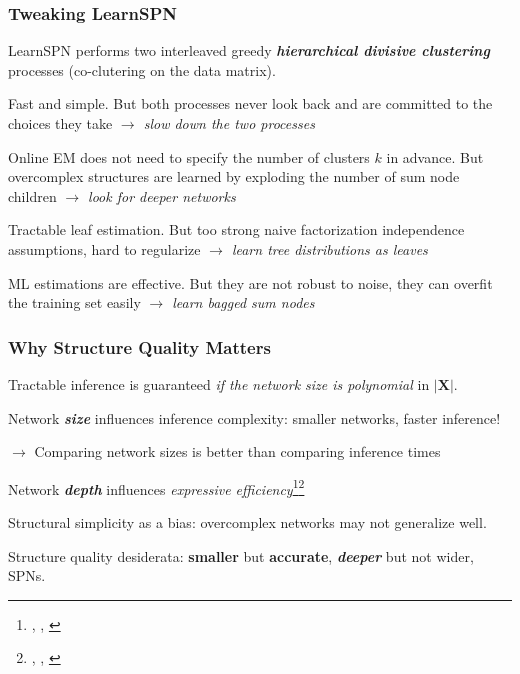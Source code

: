 \documentclass[10pt, t, xcolor={usenames,dvipsnames,svgnames}, compress]{beamer}
\newcommand{\customcite}[1]{\footnote{\scriptsize \citeauthor{#1}, \citetitle{#1}, \citeyear{#1}}}
\begin{document}
\begin{frame}
  \frametitle{Tweaking LearnSPN}
  
  \textsf{LearnSPN} performs two interleaved greedy
  \textbf{\emph{hierarchical divisive clustering}}
  processes (co-clutering on the data matrix).\par\bigskip

  Fast and simple. But both processes never look back and are
  committed to the choices they take \emph{$\rightarrow$ slow down the two
  processes}\par\bigskip

  Online EM does not need to specify the number of clusters $k$ in
  advance. But overcomplex structures are learned by exploding the number of sum
  node children \emph{$\rightarrow$ look for deeper networks}\par\bigskip

  Tractable leaf estimation. But too strong naive factorization independence
  assumptions, hard to regularize \emph{$\rightarrow$ learn tree
    distributions as leaves}\par\bigskip

  ML estimations are effective. But they are not robust to noise, they
  can overfit the training set easily
  \emph{$\rightarrow$ learn bagged sum nodes}
\end{frame}

\begin{frame}
  \frametitle{Why Structure Quality Matters}

  Tractable inference is guaranteed \emph{if the network size is polynomial} in $|\mathbf{X}|$.\par\bigskip

  Network \emph{\textbf{size}} influences inference complexity: smaller networks,
  faster inference!\par
  $\rightarrow$ Comparing network sizes is better than comparing inference times\par\bigskip

  Network \emph{\textbf{depth}} influences \emph{expressive efficiency}\customcite{Martens2014}\customcite{Zhao2015}\par\bigskip

  Structural simplicity as a bias: overcomplex networks may not generalize well.\par\bigskip
  
  Structure quality desiderata: \textbf{\textbf{smaller}} but \textbf{\textbf{accurate}}, \textbf{\emph{deeper}} but not
  wider, SPNs.
\end{frame}
\end{document}
